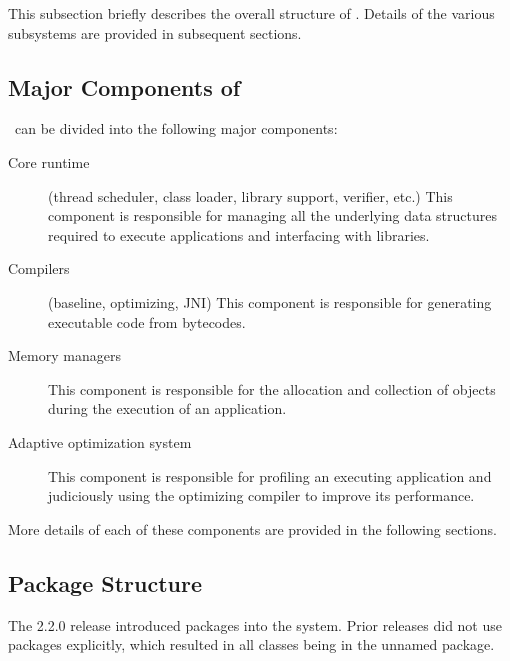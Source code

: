 This subsection briefly describes the overall structure of \jrvm.
Details of the various subsystems are provided in subsequent
sections.  

\subsection{Major Components of \jrvm}


\jrvm\ can be divided into the following major components:
\begin{description}
\item[Core runtime] (thread scheduler, class loader, library support,
verifier, etc.) This component is responsible for 
managing all the underlying data
structures required to execute applications and interfacing with
libraries.

\item[Compilers] (baseline, optimizing, JNI) This component is
responsible for generating executable code from bytecodes.

\item[Memory managers] This component is responsible for the
allocation and collection of objects during the execution of an
application. 

\item[Adaptive optimization system] This component is responsible
for profiling an executing application
and judiciously using the optimizing compiler to
improve its performance.
\end{description}

More details of each of these components are provided in the following sections.

\subsection{Package Structure}
The 2.2.0 release introduced packages into the system.  Prior releases
did not use packages explicitly, which resulted in all classes being in
the unnamed package.  

